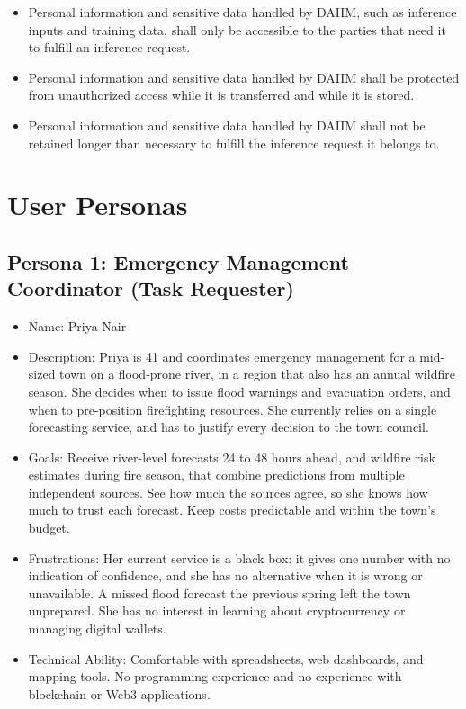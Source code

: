 \documentclass[12pt]{article}
\newcounter{srnum} %
\begin{document}
\noindent \begin{itemize}

\item[SR\refstepcounter{srnum}\thesrnum \label{SR_DataPrivacy}] Personal information and sensitive data handled by DAIIM, such as inference inputs and training data, shall only be accessible to the parties that need it to fulfill an inference request.

\item[SR\refstepcounter{srnum}\thesrnum \label{SR_DataProtection}] Personal information and sensitive data handled by DAIIM shall be protected from unauthorized access while it is transferred and while it is stored.

\item[SR\refstepcounter{srnum}\thesrnum \label{SR_DataRetention}] Personal information and sensitive data handled by DAIIM shall not be retained longer than necessary to fulfill the inference request it belongs to.

\end{itemize}

\section{User Personas}

\subsection{Persona 1: Emergency Management Coordinator (Task Requester)}
\begin{itemize}
\item Name: Priya Nair
\item Description: Priya is 41 and coordinates emergency management for a mid-sized town on a flood-prone river, in a region that also has an annual wildfire season. She decides when to issue flood warnings and evacuation orders, and when to pre-position firefighting resources. She currently relies on a single forecasting service, and has to justify every decision to the town council.
\item Goals: Receive river-level forecasts 24 to 48 hours ahead, and wildfire risk estimates during fire season, that combine predictions from multiple independent sources. See how much the sources agree, so she knows how much to trust each forecast. Keep costs predictable and within the town's budget.
\item Frustrations: Her current service is a black box: it gives one number with no indication of confidence, and she has no alternative when it is wrong or unavailable. A missed flood forecast the previous spring left the town unprepared. She has no interest in learning about cryptocurrency or managing digital wallets.
\item Technical Ability: Comfortable with spreadsheets, web dashboards, and mapping tools. No programming experience and no experience with blockchain or Web3 applications.
\end{itemize}
\end{document}
